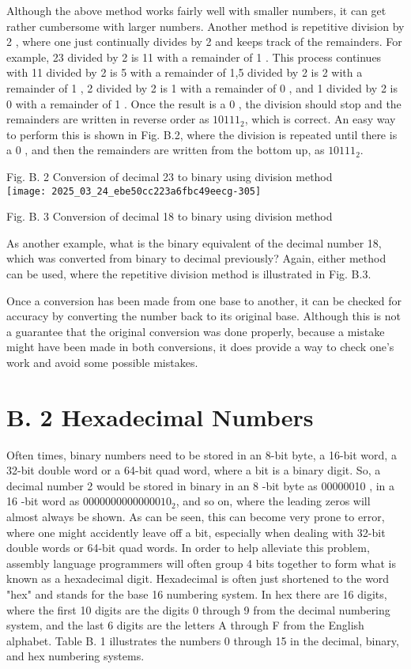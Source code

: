 \documentclass[10pt]{article}
\begin{document}
Although the above method works fairly well with smaller numbers, it can get rather cumbersome with larger numbers. Another method is repetitive division by 2 , where one just continually divides by 2 and keeps track of the remainders. For example, 23 divided by 2 is 11 with a remainder of 1 . This process continues with 11 divided by 2 is 5 with a remainder of 1,5 divided by 2 is 2 with a remainder of 1 , 2 divided by 2 is 1 with a remainder of 0 , and 1 divided by 2 is 0 with a remainder of 1 . Once the result is a 0 , the division should stop and the remainders are written in reverse order as $10111_{2}$, which is correct. An easy way to perform this is shown in Fig. B.2, where the division is repeated until there is a 0 , and then the remainders are written from the bottom up, as $10111_{2}$.

Fig. B. 2 Conversion of decimal 23 to binary using division method\\
\texttt{[image: 2025\_03\_24\_ebe50cc223a6fbc49eecg-305]}

Fig. B. 3 Conversion of decimal 18 to binary using division method

As another example, what is the binary equivalent of the decimal number 18, which was converted from binary to decimal previously? Again, either method can be used, where the repetitive division method is illustrated in Fig. B.3.

Once a conversion has been made from one base to another, it can be checked for accuracy by converting the number back to its original base. Although this is not a guarantee that the original conversion was done properly, because a mistake might have been made in both conversions, it does provide a way to check one's work and avoid some possible mistakes.

\section*{B. 2 Hexadecimal Numbers}
Often times, binary numbers need to be stored in an 8-bit byte, a 16-bit word, a 32-bit double word or a 64-bit quad word, where a bit is a binary digit. So, a decimal number 2 would be stored in binary in an 8 -bit byte as 00000010 , in a 16 -bit word as $0000000000000010_{2}$, and so on, where the leading zeros will almost always be shown. As can be seen, this can become very prone to error, where one might accidently leave off a bit, especially when dealing with 32-bit double words or 64-bit quad words. In order to help alleviate this problem, assembly language programmers will often group 4 bits together to form what is known as a hexadecimal digit. Hexadecimal is often just shortened to the word "hex" and stands for the base 16 numbering system. In hex there are 16 digits, where the first 10 digits are the digits 0 through 9 from the decimal numbering system, and the last 6 digits are the letters A through F from the English alphabet. Table B. 1 illustrates the numbers 0 through 15 in the decimal, binary, and hex numbering systems.
\end{document}

